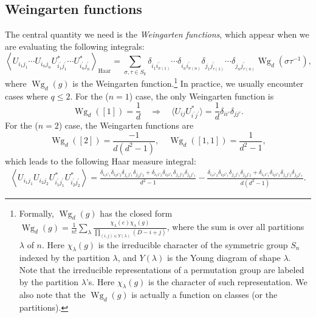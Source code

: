 \documentclass[aps,prb,superscriptaddress,nofootinbib]{revtex4}
\begin{document}
\subsection{Weingarten functions}
The central quantity we need is the \textit{Weingarten functions}, which appear when we are evaluating the following integrals:
\begin{equation}\label{eq:haar-integral}
	\left\langle U_{i_1 j_1} \cdots U_{i_n j_n} U_{i_1^{\prime} j_1^{\prime}}^* \cdots U_{i_n^{\prime} j_n^{\prime}}^* \right\rangle_\text{Haar}
	= \sum_{\sigma, \tau \in S_k} \delta_{i_1 i_{\sigma(1)}^{\prime}} \cdots \delta_{i_n i_{\sigma(n)}^{\prime}} \delta_{j_1 j_{\tau(1)}^{\prime}} \cdots \delta_{j_n j_{\tau(n)}^{\prime}} \operatorname{Wg}_d\left(\sigma \tau^{-1}\right),
\end{equation}
where $\operatorname{Wg}_d(g)$ is the Weingarten function.\footnote{Formally, $\operatorname{Wg}_d(g)$ has the closed form $\operatorname{Wg}_d(g)=\frac{1}{n!} \sum_{\lambda} \frac{\chi_\lambda(e) \chi_\lambda(g)}{\prod_{(i, j) \in Y(\lambda)}(D-i+j)}$, where the sum is over all partitions $\lambda$ of $n$.
Here $\chi_\lambda(g)$ is the irreducible character of the symmetric group $S_n$ indexed by the partition $\lambda$, and $Y(\lambda)$ is the Young diagram of shape $\lambda$. Note that the irreducible representations of a permutation group are labeled by the partition $\lambda$'s. Here $\chi_\lambda(g)$ is the character of such representation. We also note that the $\operatorname{Wg}_d(g)$ is actually a function on classes (or the partitions).}
In practice, we usually encounter cases where $q\le 2$.
For the ($n=1$) case, the only Weingarten function is
\begin{equation}
	\operatorname{Wg}_d([1]) = \frac{1}{d} \quad\Longrightarrow\quad
	\langle U_{i j} U_{i^{\prime} j^{\prime}}^* \rangle = \frac{1}{d}\delta_{ii'}\delta_{jj'}.
\end{equation}
For the ($n=2$) case, the Weingarten functions are
\begin{equation}
	\operatorname{Wg}_d([2])=\frac{-1}{d\left(d^2-1\right)}, \quad
	\operatorname{Wg}_d\left([1,1]\right)=\frac{1}{d^2-1},
\end{equation}
which leads to the following Haar measure integral:
\begin{equation}
\begin{aligned}
	\left\langle U_{i_1 j_1} U_{i_2 j_2} U_{i_1^{\prime} j_1^{\prime}}^* U_{i_2^{\prime} j_2^{\prime}}^* \right\rangle 
	= \frac{
		\delta_{i_1 i'_1}\delta_{i_2 i'_2}\delta_{j_1 j'_1}\delta_{j_2 j'_2} + 
		\delta_{i_1 i'_2}\delta_{i_2 i'_1}\delta_{j_1 j'_2}\delta_{j_2 j'_1}
	}{d^2-1} 
	-\frac{
		\delta_{i_1 i'_2}\delta_{i_2 i'_1}\delta_{j_1 j'_1}\delta_{j_2 j'_2} + 
		\delta_{i_1 i'_1}\delta_{i_2 i'_2}\delta_{j_1 j'_2}\delta_{j_2 j'_1}
	}{d(d^2-1)}.
\end{aligned}
\end{equation}
\end{document}
